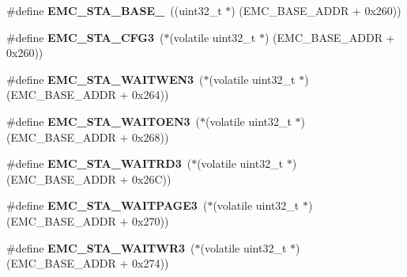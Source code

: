 \begin{DoxyCompactItemize}
\item 
\mbox{\label{group__lpc24xx__regs_ga14de6f3708441130d568066562b36c20}} 
\#define {\bfseries E\+M\+C\+\_\+\+S\+T\+A\+\_\+\+B\+A\+S\+E\+\_}~((uint32\+\_\+t $\ast$) (E\+M\+C\+\_\+\+B\+A\+S\+E\+\_\+\+A\+D\+DR + 0x260))
\item 
\mbox{\label{group__lpc24xx__regs_gaa2016c196af5a059d01a7946014d264e}} 
\#define {\bfseries E\+M\+C\+\_\+\+S\+T\+A\+\_\+\+C\+F\+G3}~($\ast$(volatile uint32\+\_\+t $\ast$) (E\+M\+C\+\_\+\+B\+A\+S\+E\+\_\+\+A\+D\+DR + 0x260))
\item 
\mbox{\label{group__lpc24xx__regs_ga99d571bddf2dc56afd79e74d67edf4e1}} 
\#define {\bfseries E\+M\+C\+\_\+\+S\+T\+A\+\_\+\+W\+A\+I\+T\+W\+E\+N3}~($\ast$(volatile uint32\+\_\+t $\ast$) (E\+M\+C\+\_\+\+B\+A\+S\+E\+\_\+\+A\+D\+DR + 0x264))
\item 
\mbox{\label{group__lpc24xx__regs_ga13748f71e2f32b5f4a3e411356a7a2ef}} 
\#define {\bfseries E\+M\+C\+\_\+\+S\+T\+A\+\_\+\+W\+A\+I\+T\+O\+E\+N3}~($\ast$(volatile uint32\+\_\+t $\ast$) (E\+M\+C\+\_\+\+B\+A\+S\+E\+\_\+\+A\+D\+DR + 0x268))
\item 
\mbox{\label{group__lpc24xx__regs_gacd3d543cc6f0489f531db7331f3ae944}} 
\#define {\bfseries E\+M\+C\+\_\+\+S\+T\+A\+\_\+\+W\+A\+I\+T\+R\+D3}~($\ast$(volatile uint32\+\_\+t $\ast$) (E\+M\+C\+\_\+\+B\+A\+S\+E\+\_\+\+A\+D\+DR + 0x26\+C))
\item 
\mbox{\label{group__lpc24xx__regs_ga4af412695b082e2546e05675190bdb24}} 
\#define {\bfseries E\+M\+C\+\_\+\+S\+T\+A\+\_\+\+W\+A\+I\+T\+P\+A\+G\+E3}~($\ast$(volatile uint32\+\_\+t $\ast$) (E\+M\+C\+\_\+\+B\+A\+S\+E\+\_\+\+A\+D\+DR + 0x270))
\item 
\mbox{\label{group__lpc24xx__regs_ga909cb7a6e4f2857e24dabc27cc8b7564}} 
\#define {\bfseries E\+M\+C\+\_\+\+S\+T\+A\+\_\+\+W\+A\+I\+T\+W\+R3}~($\ast$(volatile uint32\+\_\+t $\ast$) (E\+M\+C\+\_\+\+B\+A\+S\+E\+\_\+\+A\+D\+DR + 0x274))
\item 
\mbox{\label{group__lpc24xx__regs_gac6f02e788c97b6da2da4493705d0a81e}} 

\end{DoxyCompactItemize}
